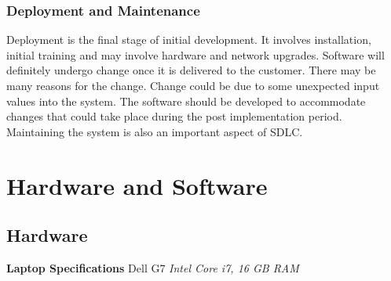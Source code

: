 \documentclass[12pt, a4paper]{report}
\begin{document}
  \subsubsection{Deployment and Maintenance}
  Deployment is the final stage of initial development. It involves installation, initial training and may involve hardware and network upgrades. Software will definitely undergo change once it is delivered to the customer. There may be many reasons for the change. Change could be due to some unexpected input values into the system. The software should be developed to accommodate changes that could take place during the post implementation period. Maintaining the system is also an important aspect of SDLC.
  
  
  \newpage
  \section{Hardware and Software}
    \subsection{Hardware}
    \textbf{Laptop Specifications} \newline \newline
    Dell G7\newline
    \emph{Intel Core i7, 16 GB RAM}
    
\end{document}
